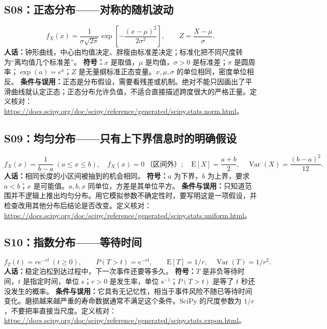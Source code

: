 \documentclass[UTF8,zihao=-4,openany,oneside,fontset=windows]{ctexbook}
\begin{document}
\subsection{S08：正态分布——对称的随机波动}
\begin{equation}
 f_X(x)=\frac{1}{\sigma\sqrt{2\pi}}\exp\!\left[-\frac{(x-\mu)^2}{2\sigma^2}\right],\qquad Z=\frac{X-\mu}{\sigma}.
\end{equation}
\textbf{人话：}钟形曲线，中心由均值决定、胖瘦由标准差决定；标准化把不同尺度转为“离均值几个标准差”。
\textbf{符号：}$x$ 是取值，$\mu$ 是均值，$\sigma>0$ 是标准差；$\pi$ 是圆周率；$\exp(a)=e^a$；$Z$ 是无量纲标准正态变量。$x,\mu,\sigma$ 的单位相同，密度单位相反。
\textbf{条件与误用：}正态是分布假设，需要看残差或机制。绝对不能只因画出了平滑曲线就认定正态；正态分布允许负值，不适合直接描述跨度很大的严格正量。定义核对：\url{https://docs.scipy.org/doc/scipy/reference/generated/scipy.stats.norm.html}。

\subsection{S09：均匀分布——只有上下界信息时的明确假设}
\begin{equation}
 f_X(x)=\frac{1}{b-a}\ (a\le x\le b),\quad f_X(x)=0\ \text{（区间外）};
 \quad\mathrm{E}[X]=\frac{a+b}{2},\quad\operatorname{Var}(X)=\frac{(b-a)^2}{12}.
\end{equation}
\textbf{人话：}相同长度的小区间被抽到的机会相同。
\textbf{符号：}$a$ 为下界，$b$ 为上界，要求 $a<b$；$x$ 是可能值。$a,b,x$ 同单位，方差是其单位平方。
\textbf{条件与误用：}只知道范围并不逻辑上推出均匀分布。用它模拟参数不确定性时，要写明这是一项假设，并检查改用其他分布后结论是否改变。定义核对：\url{https://docs.scipy.org/doc/scipy/reference/generated/scipy.stats.uniform.html}。

\subsection{S10：指数分布——等待时间}
\begin{equation}
 f_T(t)=r e^{-rt}\ (t\ge0),\qquad P(T>t)=e^{-rt},\qquad
 \mathrm{E}[T]=1/r,\quad\operatorname{Var}(T)=1/r^2.
\end{equation}
\textbf{人话：}稳定泊松到达过程中，下一次事件还要等多久。
\textbf{符号：}$T$ 是非负等待时间，$t$ 是指定时间，单位 s；$r>0$ 是发生率，单位 $\mathrm{s}^{-1}$；$P(T>t)$ 是等了 $t$ 秒还没发生的概率。
\textbf{条件与误用：}它具有无记忆性，相当于事件风险不随已等待时间变化。磨损越来越严重的寿命数据通常不满足这个条件。SciPy 的尺度参数为 $1/r$，不要把率直接当尺度。定义核对：\url{https://docs.scipy.org/doc/scipy/reference/generated/scipy.stats.expon.html}。
\end{document}
